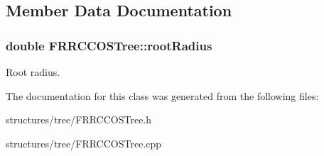 \subsection{Member Data Documentation}
\subsubsection[{\texorpdfstring{root\+Radius}{rootRadius}}]{\setlength{\rightskip}{0pt plus 5cm}double F\+R\+R\+C\+C\+O\+S\+Tree\+::root\+Radius\hspace{0.3cm}{\ttfamily [private]}}\hypertarget{class_f_r_r_c_c_o_s_tree_a7cbf3091db38b3b573b84be820890bba}{}\label{class_f_r_r_c_c_o_s_tree_a7cbf3091db38b3b573b84be820890bba}
Root radius. 

The documentation for this class was generated from the following files\+:\begin{DoxyCompactItemize}
\item 
structures/tree/F\+R\+R\+C\+C\+O\+S\+Tree.\+h\item 
structures/tree/F\+R\+R\+C\+C\+O\+S\+Tree.\+cpp\end{DoxyCompactItemize}
